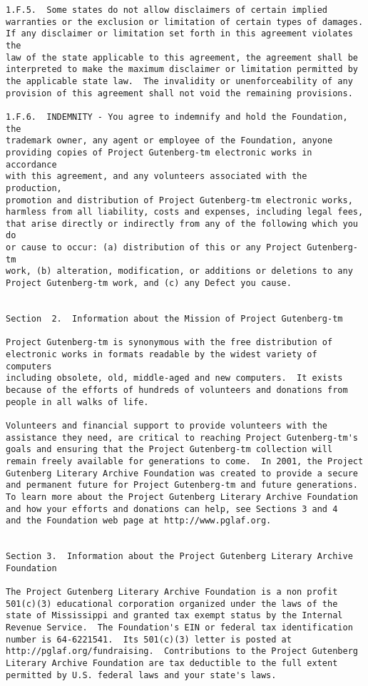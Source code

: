 \documentclass[oneside]{book}
\begin{document}
\begin{verbatim}
1.F.5.  Some states do not allow disclaimers of certain implied
warranties or the exclusion or limitation of certain types of damages.
If any disclaimer or limitation set forth in this agreement violates the
law of the state applicable to this agreement, the agreement shall be
interpreted to make the maximum disclaimer or limitation permitted by
the applicable state law.  The invalidity or unenforceability of any
provision of this agreement shall not void the remaining provisions.

1.F.6.  INDEMNITY - You agree to indemnify and hold the Foundation, the
trademark owner, any agent or employee of the Foundation, anyone
providing copies of Project Gutenberg-tm electronic works in accordance
with this agreement, and any volunteers associated with the production,
promotion and distribution of Project Gutenberg-tm electronic works,
harmless from all liability, costs and expenses, including legal fees,
that arise directly or indirectly from any of the following which you do
or cause to occur: (a) distribution of this or any Project Gutenberg-tm
work, (b) alteration, modification, or additions or deletions to any
Project Gutenberg-tm work, and (c) any Defect you cause.


Section  2.  Information about the Mission of Project Gutenberg-tm

Project Gutenberg-tm is synonymous with the free distribution of
electronic works in formats readable by the widest variety of computers
including obsolete, old, middle-aged and new computers.  It exists
because of the efforts of hundreds of volunteers and donations from
people in all walks of life.

Volunteers and financial support to provide volunteers with the
assistance they need, are critical to reaching Project Gutenberg-tm's
goals and ensuring that the Project Gutenberg-tm collection will
remain freely available for generations to come.  In 2001, the Project
Gutenberg Literary Archive Foundation was created to provide a secure
and permanent future for Project Gutenberg-tm and future generations.
To learn more about the Project Gutenberg Literary Archive Foundation
and how your efforts and donations can help, see Sections 3 and 4
and the Foundation web page at http://www.pglaf.org.


Section 3.  Information about the Project Gutenberg Literary Archive
Foundation

The Project Gutenberg Literary Archive Foundation is a non profit
501(c)(3) educational corporation organized under the laws of the
state of Mississippi and granted tax exempt status by the Internal
Revenue Service.  The Foundation's EIN or federal tax identification
number is 64-6221541.  Its 501(c)(3) letter is posted at
http://pglaf.org/fundraising.  Contributions to the Project Gutenberg
Literary Archive Foundation are tax deductible to the full extent
permitted by U.S. federal laws and your state's laws.


\end{verbatim}
\end{document}
